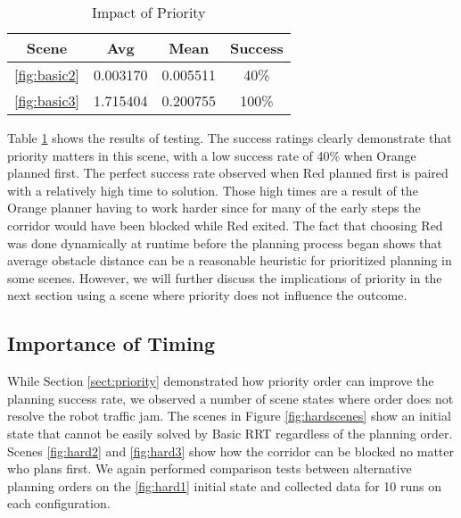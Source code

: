 \documentclass[12pt,journal,compsoc]{IEEEtran}
\begin{document}
\begin{table}[ht]
\renewcommand{\arraystretch}{1.3}
\caption{Impact of Priority}
\label{basicresults}
\centering 
\begin{tabular}{||c||c||c||c||}
\hline
\bfseries Scene & \bfseries Avg & \bfseries Mean & \bfseries Success\\
\hline\hline
\ref{fig:basic2} & 0.003170 & 0.005511 & 40\%\\
\hline
\ref{fig:basic3} & 1.715404 & 0.200755 & 100\%\\
\hline
\hline
\end{tabular}
\end{table}
Table \ref{basicresults} shows the results of testing. The success ratings clearly demonstrate that priority matters in this scene, with a low success rate of 40\% when Orange planned first. The perfect success rate observed when Red planned first is paired with a relatively high time to solution. Those high times are a result of the Orange planner having to work harder since for many of the early steps the corridor would have been blocked while Red exited. The fact that choosing Red was done dynamically at runtime before the planning process began shows that average obstacle distance can be a reasonable heuristic for prioritized planning in some scenes. However, we will further discuss the implications of priority in the next section using a scene where priority does not influence the outcome.


\subsection{Importance of Timing}
While Section \ref{sect:priority} demonstrated how priority order can improve the planning success rate, we observed a number of scene states where order does not resolve the robot traffic jam. The scenes in Figure \ref{fig:hardscenes} show an initial state that cannot be easily solved by Basic RRT regardless of the planning order. Scenes \ref{fig:hard2} and \ref{fig:hard3} show how the corridor can be blocked no matter who plans first. We again performed comparison tests between alternative planning orders on the \ref{fig:hard1} initial state and collected data for 10 runs on each configuration.
\end{document}
